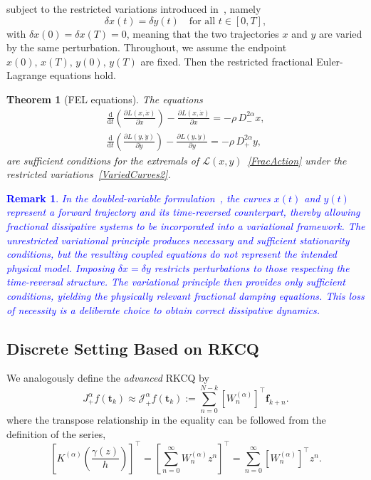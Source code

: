 \documentclass[a4paper,10pt,reqno]{amsart}
\newtheorem{theorem}{Theorem}[section]
\newtheorem{remark}{Remark}[section]
\theoremstyle{definition}
\newcommand{\lp}{\left(}
\newcommand{\rp}{\right)}
\newcommand{\der}{\partial}
\newcommand{\dd}{\mathrm{d}}
\renewcommand{\L}{\mathcal{L}}
\begin{document}
subject to the restricted variations introduced in~\cite{JiOb2}, namely
\begin{equation}\label{VariedCurves2}
\delta x(t)=\delta y(t)\quad \text{for all } t\in[0,T],
\end{equation}
with  $\delta x(0)=\delta x(T)=0$, meaning that the two trajectories $x$ and $y$ are varied by the same perturbation. Throughout, we assume the endpoint $x(0),\,x(T),\,y(0),\,y(T)$ are fixed. Then  the restricted fractional Euler-Lagrange equations hold.
\begin{theorem}[FEL equations]\label{ContTheo}
The equations
\begin{subequations}\label{ContFracDamp}
\begin{align}
\frac{\dd}{\dd t}\lp\frac{\der L(x,\dot x)}{\der\dot x}\rp-\frac{\der L(x,\dot x)}{\der x}=-\rho\,D^{2\alpha}_{-}x,\label{ContFracDamp:a}\\
\frac{\dd}{\dd t}\lp\frac{\der L(y,\dot y)}{\der\dot y}\rp-\frac{\der L(y,\dot y)}{\der y}=-\rho\,D^{2\alpha}_{+}y,\label{ContFracDamp:b}
\end{align}
\end{subequations}
are  {\rm sufficient} conditions for the extremals of $\L(x,y)$~\eqref{FracAction} under the  restricted variations~\eqref{VariedCurves2}.
\end{theorem}
\textcolor{blue}{\begin{remark}
In the doubled-variable formulation~\cite{JiOb2}, the curves $x(t)$ and $y(t)$ represent a forward trajectory and its time-reversed counterpart, thereby allowing fractional dissipative systems to be incorporated into a variational framework. The unrestricted variational principle produces necessary and sufficient stationarity conditions, but the resulting coupled equations do not represent the intended physical model.
Imposing  $\delta x=\delta y$ restricts perturbations to those respecting the time-reversal structure. The variational principle then provides only sufficient conditions, yielding the physically relevant fractional damping equations. This loss of necessity is a deliberate choice to obtain correct dissipative dynamics.
\end{remark}}

\subsection{Discrete Setting Based on RKCQ}\label{subsec:Discrete_Setting}
We analogously define the \textit{advanced} RKCQ by 
\begin{equation}\label{RKConQuaPlus}
J_{+}^{\alpha}f(\mathbf t_k)\approx\mathcal{J}_{+}^{\alpha}f(\mathbf t_k):=\sum_{n=0}^{N-k}\left[W_{n}^{(\alpha)}\right]^\top\mathbf{f}_{k+n}.
\end{equation}
 where the transpose relationship  in the equality can be followed from the definition of the series,
\[
\left[K^{(\alpha)}\lp\frac{\gamma(z)}{h}\rp\right]^\top=\left[\sum_{n=0}^{\infty} W_n^{(\alpha)}z^n\right]^\top = \sum_{n=0}^{\infty} \left[W_n^{(\alpha)}\right]^\top z^n.
\]
\end{document}
